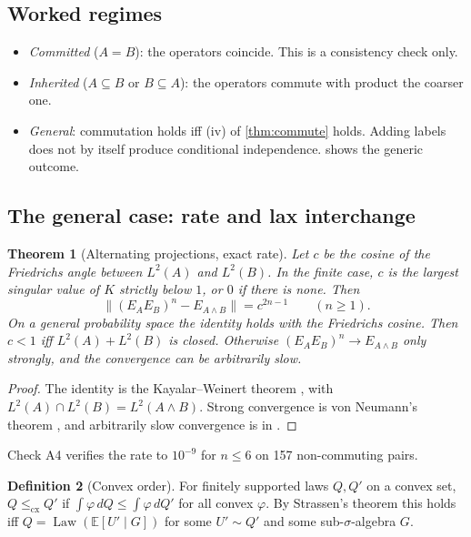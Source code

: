\documentclass[11pt]{article}
\newtheorem{theorem}{Theorem}[section]
\theoremstyle{definition}
\newtheorem{definition}[theorem]{Definition}
\newcommand{\cx}{\le_{\mathrm{cx}}}
\newcommand{\Law}{\operatorname{Law}}
\newcommand{\EE}{\mathbb E}
\begin{document}
\subsection{Worked regimes}
\begin{itemize}
\item \emph{Committed} ($A=B$): the operators coincide. This is a consistency check only.
\item \emph{Inherited} ($A\subseteq B$ or $B\subseteq A$): the operators commute with product the coarser one.
\item \emph{General}: commutation holds iff (iv) of \cref{thm:commute} holds. Adding labels does not by itself produce conditional
  independence.  shows the generic outcome.
\end{itemize}

\subsection{The general case: rate and lax interchange}

\begin{theorem}[Alternating projections, exact rate]\label{thm:rate}
Let $c$ be the cosine of the Friedrichs angle between $L^2(A)$ and $L^2(B)$. In the finite case, $c$ is the largest singular value of
$K$ strictly below $1$, or $0$ if there is none. Then
\[
\lVert(E_AE_B)^n-E_{A\wedge B}\rVert=c^{2n-1}\qquad(n\ge1).
\]
On a general probability space the identity holds with the Friedrichs cosine. Then $c<1$ iff $L^2(A)+L^2(B)$ is closed. Otherwise
$(E_AE_B)^n\to E_{A\wedge B}$ only strongly, and the convergence can be arbitrarily slow.
\end{theorem}
\begin{proof}
The identity is the Kayalar--Weinert theorem \cite{KayalarWeinert1988}, with $L^2(A)\cap L^2(B)=L^2(A\wedge B)$. Strong convergence
is von Neumann's theorem \cite{vonNeumann1950}, and arbitrarily slow convergence is in \cite{BauschkeDeutschHundal2009}.
\end{proof}

Check A4 verifies the rate to $10^{-9}$ for $n\le6$ on 157 non-commuting pairs.

\begin{definition}[Convex order]
For finitely supported laws $Q,Q'$ on a convex set, $Q\cx Q'$ if $\int\varphi\,dQ\le\int\varphi\,dQ'$ for all convex $\varphi$. By
Strassen's theorem \cite{Strassen1965} this holds iff $Q=\Law(\EE[U'\mid G])$ for some $U'\sim Q'$ and some sub-$\sigma$-algebra $G$.
\end{definition}
\end{document}
